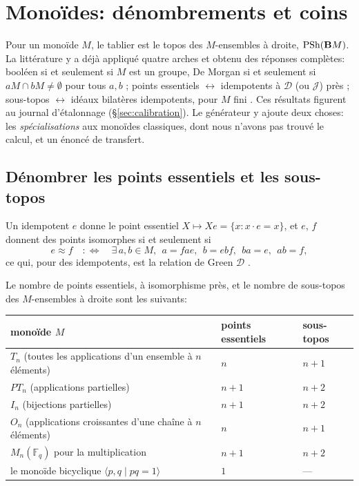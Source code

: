 \section{Monoïdes: dénombrements et coins}\label{sec:finite}

Pour un monoïde $M$, le tablier est le topos des $M$-ensembles à droite, $\mathrm{PSh}(\mathbf{B} M)$. La littérature y a déjà appliqué quatre arches et obtenu des réponses complètes: booléen si et seulement si $M$ est un groupe, De Morgan si et seulement si $aM\cap bM\neq\emptyset$ pour tous $a,b$ \cite{hemelaer-rogers}; points essentiels $\leftrightarrow$ idempotents à $\mathcal D$ (ou $\mathcal J$) près \cite{rogers-1905,pirashvili-jncg}; sous-topos $\leftrightarrow$ idéaux bilatères idempotents, pour $M$ fini \cite[Prop.~6.1.2]{pirashvili-jncg}. Ces résultats figurent au journal d'étalonnage (\S\ref{sec:calibration}). Le générateur y ajoute deux choses: les \emph{spécialisations} aux monoïdes classiques, dont nous n'avons pas trouvé le calcul, et un énoncé de transfert.

\subsection{Dénombrer les points essentiels et les sous-topos}

Un idempotent $e$ donne le point essentiel $X\mapsto Xe = \{x : x\cdot e = x\}$, et $e$, $f$ donnent des points isomorphes si et seulement si
\[
e\approx f\quad:\iff\quad\exists\, a,b\in M,\ \ a = fae,\ \ b = ebf,\ \ ba = e,\ \ ab = f,
\]
ce qui, pour des idempotents, est la relation de Green $\mathcal D$ \cite[Prop.~3.1]{costa-steinberg}.

\begin{theorem}\label{th:fibre}
Le nombre de points essentiels, à isomorphisme près, et le nombre de sous-topos des $M$-ensembles à droite sont les suivants:
\begin{center}\small
\begin{tabular}{lll}
\toprule
monoïde $M$ & points essentiels & sous-topos\\
\midrule
$T_n$ (toutes les applications d'un ensemble à $n$ éléments) & $n$ & $n+1$\\
$PT_n$ (applications partielles) & $n+1$ & $n+2$\\
$I_n$ (bijections partielles) & $n+1$ & $n+2$\\
$O_n$ (applications croissantes d'une chaîne à $n$ éléments) & $n$ & $n+1$\\
$M_n(\mathbb F_q)$ pour la multiplication & $n+1$ & $n+2$\\
le monoïde bicyclique $\langle p,q\mid pq=1\rangle$ & $1$ & ---\\
\bottomrule
\end{tabular}
\end{center}
\end{theorem}

